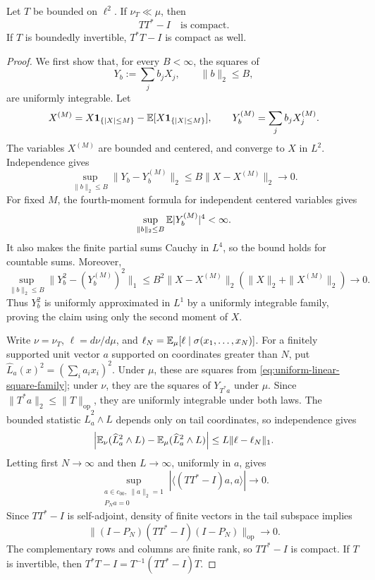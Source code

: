 \begin{lemma}
\label{lem:compact-covariance-rigidity}
Let $T$ be bounded on $\ell^2$.  If $\nu_T\ll\mu$, then
\[
 TT^*-I\quad\text{is compact}.
\]
If $T$ is boundedly invertible, $T^*T-I$ is compact as well.
\end{lemma}
\begin{proof}
We first show that, for every $B<\infty$, the squares of
\begin{equation}
 Y_b:=\sum_jb_jX_j,\qquad \|b\|_2\leq B,
 \label{eq:uniform-linear-square-family}
\end{equation}
are uniformly integrable.  Let
\[
 X^{(M)}=X\mathbf1_{\{|X|\leq M\}}
           -\mathbb E[X\mathbf1_{\{|X|\leq M\}}],
 \qquad Y_b^{(M)}=\sum_jb_jX_j^{(M)}.
\]
The variables $X^{(M)}$ are bounded and centered, and converge to $X$
in $L^2$.  Independence gives
\[
 \sup_{\|b\|_2\leq B}\|Y_b-Y_b^{(M)}\|_2
 \leq B\|X-X^{(M)}\|_2\longrightarrow0.
\]
For fixed $M$, the fourth-moment formula for independent centered variables
gives
\[
 \sup_{\|b\|_2\leq B}\mathbb E|Y_b^{(M)}|^4<\infty.
\]
It also makes the finite partial sums Cauchy in $L^4$, so the bound holds for
countable sums.  Moreover,
\[
 \sup_{\|b\|_2\leq B}
 \bigl\|Y_b^2-(Y_b^{(M)})^2\bigr\|_1
 \leq B^2\|X-X^{(M)}\|_2
                  (\|X\|_2+\|X^{(M)}\|_2)
 \longrightarrow0.
\]
Thus $Y_b^2$ is uniformly approximated in $L^1$ by a uniformly integrable
family, proving the claim using only the second moment of $X$.

Write $\nu=\nu_T$, $\ell=d\nu/d\mu$, and
$\ell_N=\mathbb E_\mu[\ell\mid\sigma(x_1,\ldots,x_N)]$.
For a finitely supported unit vector $a$ supported on coordinates greater than
$N$, put
$\widehat L_a(x)^2=(\sum_i a_ix_i)^2$.  Under $\mu$, these are squares from
\eqref{eq:uniform-linear-square-family}; under $\nu$, they are the squares of
$Y_{T^*a}$ under $\mu$.  Since $\|T^*a\|_2\leq\|T\|_{\mathrm{op}}$, they are
uniformly integrable under both laws.  The bounded statistic $\widehat L_a^2\wedge L$
depends only on tail coordinates, so independence gives
\[
 \left|\mathbb E_\nu(\widehat L_a^2\wedge L)-\mathbb E_\mu(\widehat L_a^2\wedge L)\right|
 \leq L\|\ell-\ell_N\|_1.
\]
Letting first $N\to\infty$ and then $L\to\infty$, uniformly in $a$, gives
\[
 \sup_{\substack{a\in c_{00},\ \|a\|_2=1\\ P_Na=0}}
 \left|\langle(TT^*-I)a,a\rangle\right|\longrightarrow0.
\]
Since $TT^*-I$ is self-adjoint, density of finite vectors in the tail
subspace implies
\[
 \|(I-P_N)(TT^*-I)(I-P_N)\|_{\mathrm{op}}\longrightarrow0.
\]
The complementary rows and columns are finite rank, so $TT^*-I$ is compact.
If $T$ is invertible, then
$T^*T-I=T^{-1}(TT^*-I)T$.
\end{proof}

